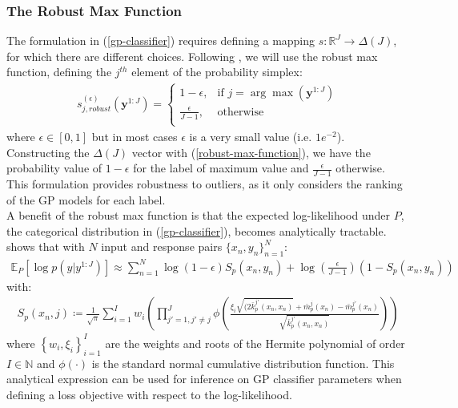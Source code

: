 \documentclass{article}
\numberwithin{equation}{section}
\begin{document}
\subsubsection{The Robust Max Function}
The formulation in (\ref{gp-classifier}) requires defining a mapping $s: \mathbb{R}^J \rightarrow \Delta(J)$, for which there are different choices. Following \cite{wild2022generalized}, we will use the robust max function, defining the $j^{th}$ element of the probability simplex:
\begin{align}
s_{j, robust}^{(\epsilon)}\left(\mathbf{y}^{1:J}\right) = \begin{cases}
      1-\epsilon, &  \text{if } j = \arg \max\left(\mathbf{y}^{1:J}\right) \\
      \frac{\epsilon}{J-1}, & \text{otherwise} \\
   \end{cases}
   \label{robust-max-function}
\end{align}
where $\epsilon \in [0, 1]$ but in most cases $\epsilon$ is a very small value (i.e. $1e^{-2}$). Constructing the $\Delta(J)$ vector with (\ref{robust-max-function}), we have the probability value of $1-\epsilon$ for the label of maximum value and $\frac{\epsilon}{J-1}$ otherwise. This formulation provides robustness to outliers, as it only considers the ranking of the GP models for each label.
\\A benefit of the robust max function is that the expected log-likelihood under $P$, the categorical distribution in (\ref{gp-classifier}), becomes analytically tractable. \cite{wild2022generalized} shows that with $N$ input and response pairs $\{x_n, y_n\}_{n=1}^N$:
\begin{align}
    \mathbb{E}_{P} \left[\log p\left(y \vert y^{1:J}\right)\right] \approx \sum_{n=1}^N \log(1-\epsilon) S_p(x_n, y_n) + \log\left(\frac{\epsilon}{J-1}\right) \left(1-S_p(x_n, y_n)\right)
    \label{robust-max-function-expected-log-likelihood}
\end{align}
with:
\begin{align}
    S_p(x_n, j) \coloneqq \frac{1}{\sqrt{\pi}}\sum_{i=1}^{I} w_i \left(\prod_{j'=1, j'\neq j}^J \phi\left(\frac{\xi_i\sqrt{(2 \bar{k}^{j'}_p(x_n, x_n)}+\bar{m}^{j}_p(x_n) - \bar{m}^{j'}_p(x_n)}{\sqrt{\bar{k}^{j'}_p(x_n, x_n)}}\right)\right)
\end{align}
where $\left\{w_i, \xi_i\right\}_{i=1}^I$ are the weights and roots of the Hermite polynomial of order $I \in \mathbb{N}$ and  $\phi(\cdot)$ is the standard normal cumulative distribution function. This analytical expression can be used for inference on GP classifier parameters when defining a loss objective with respect to the log-likelihood.
\end{document}
